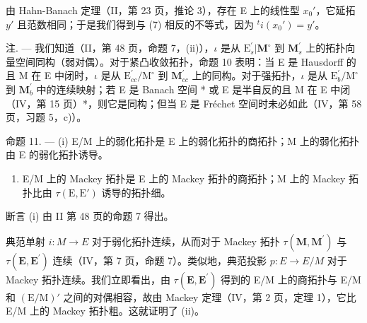 由 Hahn-Banach 定理（II，第 23 页，推论 3），存在 E 上的线性型 \(x_0'\)，它延拓 \(y'\) 且范数相同；于是我们得到与 (7) 相反的不等式，因为 \({}^t i(x_0') = y'\)。

注. --- 我们知道（II，第 48 页，命题 7，(ii)），\(\iota\) 是从 \(\mathrm{E}_s^{\prime}|\mathbf{M}^{\circ}\) 到 \(\mathbf{M}_s^\prime\) 上的拓扑向量空间同构（弱对偶）。对于紧凸收敛拓扑，命题 10 表明：当 E 是 Hausdorff 的且 M 在 E 中闭时，\(\iota\) 是从 \(\mathrm{E}_{cc}^{\prime}/\mathrm{M}^{\circ}\) 到 \(\mathbf{M}_{cc}^{\prime}\) 上的同构。对于强拓扑，\(\iota\) 是从 \(\mathrm{E}_b^{\prime}/\mathrm{M}^{\circ}\) 到 \(\mathbf{M}_b^{\prime}\) 中的连续映射；若 E 是 Banach 空间 * 或 E 是半自反的且 M 在 E 中闭（IV，第 15 页）*，则它是同构；但当 E 是 Fréchet 空间时未必如此（IV，第 58 页，习题 5，c)）。

命题 11. --- (i) E/M 上的弱化拓扑是 E 上的弱化拓扑的商拓扑；M 上的弱化拓扑由 E 的弱化拓扑诱导。

\begin{enumerate}
\def\labelenumi{(\roman{enumi})}
\setcounter{enumi}{1}
\tightlist
\item
  E/M 上的 Mackey 拓扑是 E 上的 Mackey 拓扑的商拓扑；M 上的 Mackey 拓扑比由 \(\tau(\mathrm{E}, \mathrm{E}')\) 诱导的拓扑细。
\end{enumerate}

断言 (i) 由 II 第 48 页的命题 7 得出。

典范单射 \(i:M\to E\) 对于弱化拓扑连续，从而对于 Mackey 拓扑 \(\tau(\mathbf{M},\mathbf{M}^{\prime})\) 与 \(\tau(\mathbf{E},\mathbf{E}^{\prime})\) 连续（IV，第 7 页，命题 7）。类似地，典范投影 \(p:E\to E/M\) 对于 Mackey 拓扑连续。我们立即看出，由 \(\tau(\mathbf{E},\mathbf{E}^{\prime})\) 得到的 E/M 上的商拓扑与 E/M 和 \((\mathrm{E}/\mathrm{M})'\) 之间的对偶相容，故由 Mackey 定理（IV，第 2 页，定理 1），它比 E/M 上的 Mackey 拓扑粗。这就证明了 (ii)。

